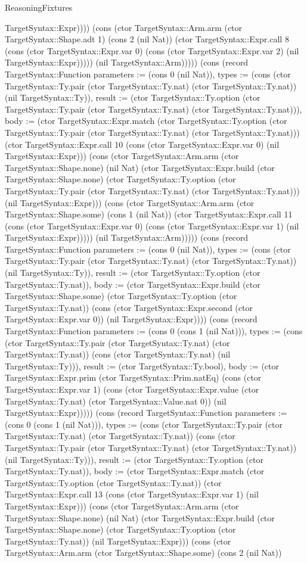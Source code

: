 \begin{lexlean}{ReasoningFixtures}
\begin{semanticmodule}
{TargetSyntax::Expr)))) (cons (ctor TargetSyntax::Arm.arm (ctor TargetSyntax::Shape.adt 1) (cons 2 (nil Nat)) (ctor TargetSyntax::Expr.call 8 (cons (ctor TargetSyntax::Expr.var 0) (cons (ctor TargetSyntax::Expr.var 2) (nil TargetSyntax::Expr))))) (nil TargetSyntax::Arm))))}) (cons (record TargetSyntax::Function {parameters := (cons 0 (nil Nat)), types := (cons (ctor TargetSyntax::Ty.pair (ctor TargetSyntax::Ty.nat) (ctor TargetSyntax::Ty.nat)) (nil TargetSyntax::Ty)), result := (ctor TargetSyntax::Ty.option (ctor TargetSyntax::Ty.pair (ctor TargetSyntax::Ty.nat) (ctor TargetSyntax::Ty.nat))), body := (ctor TargetSyntax::Expr.match (ctor TargetSyntax::Ty.option (ctor TargetSyntax::Ty.pair (ctor TargetSyntax::Ty.nat) (ctor TargetSyntax::Ty.nat))) (ctor TargetSyntax::Expr.call 10 (cons (ctor TargetSyntax::Expr.var 0) (nil TargetSyntax::Expr))) (cons (ctor TargetSyntax::Arm.arm (ctor TargetSyntax::Shape.none) (nil Nat) (ctor TargetSyntax::Expr.build (ctor TargetSyntax::Shape.none) (ctor TargetSyntax::Ty.option (ctor TargetSyntax::Ty.pair (ctor TargetSyntax::Ty.nat) (ctor TargetSyntax::Ty.nat))) (nil TargetSyntax::Expr))) (cons (ctor TargetSyntax::Arm.arm (ctor TargetSyntax::Shape.some) (cons 1 (nil Nat)) (ctor TargetSyntax::Expr.call 11 (cons (ctor TargetSyntax::Expr.var 0) (cons (ctor TargetSyntax::Expr.var 1) (nil TargetSyntax::Expr))))) (nil TargetSyntax::Arm))))}) (cons (record TargetSyntax::Function {parameters := (cons 0 (nil Nat)), types := (cons (ctor TargetSyntax::Ty.pair (ctor TargetSyntax::Ty.nat) (ctor TargetSyntax::Ty.nat)) (nil TargetSyntax::Ty)), result := (ctor TargetSyntax::Ty.option (ctor TargetSyntax::Ty.nat)), body := (ctor TargetSyntax::Expr.build (ctor TargetSyntax::Shape.some) (ctor TargetSyntax::Ty.option (ctor TargetSyntax::Ty.nat)) (cons (ctor TargetSyntax::Expr.second (ctor TargetSyntax::Expr.var 0)) (nil TargetSyntax::Expr)))}) (cons (record TargetSyntax::Function {parameters := (cons 0 (cons 1 (nil Nat))), types := (cons (ctor TargetSyntax::Ty.pair (ctor TargetSyntax::Ty.nat) (ctor TargetSyntax::Ty.nat)) (cons (ctor TargetSyntax::Ty.nat) (nil TargetSyntax::Ty))), result := (ctor TargetSyntax::Ty.bool), body := (ctor TargetSyntax::Expr.prim (ctor TargetSyntax::Prim.natEq) (cons (ctor TargetSyntax::Expr.var 1) (cons (ctor TargetSyntax::Expr.value (ctor TargetSyntax::Ty.nat) (ctor TargetSyntax::Value.nat 0)) (nil TargetSyntax::Expr))))}) (cons (record TargetSyntax::Function {parameters := (cons 0 (cons 1 (nil Nat))), types := (cons (ctor TargetSyntax::Ty.pair (ctor TargetSyntax::Ty.nat) (ctor TargetSyntax::Ty.nat)) (cons (ctor TargetSyntax::Ty.pair (ctor TargetSyntax::Ty.nat) (ctor TargetSyntax::Ty.nat)) (nil TargetSyntax::Ty))), result := (ctor TargetSyntax::Ty.option (ctor TargetSyntax::Ty.nat)), body := (ctor TargetSyntax::Expr.match (ctor TargetSyntax::Ty.option (ctor TargetSyntax::Ty.nat)) (ctor TargetSyntax::Expr.call 13 (cons (ctor TargetSyntax::Expr.var 1) (nil TargetSyntax::Expr))) (cons (ctor TargetSyntax::Arm.arm (ctor TargetSyntax::Shape.none) (nil Nat) (ctor TargetSyntax::Expr.build (ctor TargetSyntax::Shape.none) (ctor TargetSyntax::Ty.option (ctor TargetSyntax::Ty.nat)) (nil TargetSyntax::Expr))) (cons (ctor TargetSyntax::Arm.arm (ctor TargetSyntax::Shape.some) (cons 2 (nil Nat)) }
\end{semanticmodule}
\end{lexlean}
